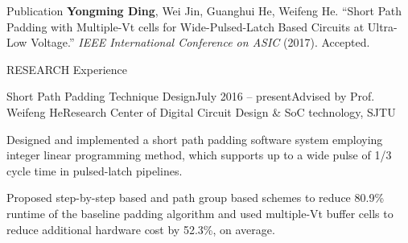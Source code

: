 \documentclass{resume_ucla} %
\begin{document}
\begin{rSection}{Publication}
\textbf{Yongming Ding}, Wei Jin, Guanghui He, Weifeng He. ``Short Path Padding with Multiple-Vt cells for Wide-Pulsed-Latch Based Circuits at Ultra-Low Voltage.'' \emph{IEEE International Conference on ASIC}  (2017). Accepted.
\end{rSection}

\begin{rSection}{RESEARCH Experience}
\begin{rSubsection}{Short Path Padding Technique Design}{July 2016 -- present}{Advised by Prof. Weifeng He}{Research Center of Digital Circuit Design \& SoC technology, SJTU}
\item Designed and implemented a short path padding software system employing integer linear programming method, which supports up to a wide pulse of 1/3 cycle time in pulsed-latch pipelines.
\item Proposed step-by-step based and path group based schemes to reduce 80.9\% runtime of the baseline padding algorithm and used multiple-Vt buffer cells to reduce additional hardware cost by 52.3\%, on average. 
\end{rSubsection}

\begin{comment}
\begin{rSubsection}{Image Super-Resolution Using Convolutional Neural Network(CNN)}{July 2017}{}{}
\item Applied deep learning techniques to sharpen or improve the quality of a low-resolution image input by outputting a super-resolved high-resolution image. Proposed a 7-layers CNN which got lower loss value and reduced 10\% training time, compared with ``waifu2x'', an open source image super-resolution software.
\end{rSubsection}


\begin{rSubsection}{``Eye of Providence'', an Intelligent Monitoring System}{May 2017}{}{}
\item Led a group of 4 teammates to build an intelligent classroom monitoring system using face recognition, facial expression detection and speech identification techniques during ``Hackathon SJTU 2017''.
\end{rSubsection}
\end{comment}


\end{rSection}
\end{document}
